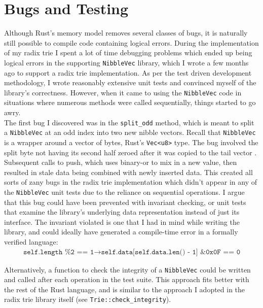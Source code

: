 \documentclass[a4paper,12pt]{article}
\newcommand{\code}[1]{\texttt{#1}}
\begin{document}
\section{Bugs and Testing}

Although Rust's memory model removes several classes of bugs, it is naturally still possible to compile code containing logical errors. During the implementation of my radix trie I spent a lot of time debugging problems which ended up being logical errors in the supporting \code{NibbleVec} library, which I wrote a few months ago to support a radix trie implementation. As per the test driven development methodology, I wrote reasonably extensive unit tests and convinced myself of the library's correctness. However, when it came to using the \code{NibbleVec} code in situations where numerous methods were called sequentially, things started to go awry.\\

The first bug I discovered was in the \code{split\_odd} method, which is meant to split a \code{NibbleVec} at an odd index into two new nibble vectors. Recall that \code{NibbleVec} is a wrapper around a vector of bytes, Rust's \code{Vec<u8>} type. The bug involved the split byte not having its second half zeroed after it was copied to the tail vector \cite{nibble-vec-split-odd-fix}. Subsequent calls to push, which uses binary-or to mix in a new value, then resulted in stale data being combined with newly inserted data. This created all sorts of zany bugs in the radix trie implementation which didn't appear in any of the \code{NibbleVec} unit tests due to the reliance on sequential operations. I argue that this bug could have been prevented with invariant checking, or unit tests that examine the library's underlying data representation instead of just its interface. The invariant violated is one that I had in mind while writing the library, and could ideally have generated a compile-time error in a formally verified language:
\begin{eqnarray*}
\code{self.length \% 2 == 1} \rightarrow \code{self.data[self.data.len() - 1] \& 0x0F == 0}
\end{eqnarray*}

Alternatively, a function to check the integrity of a \code{NibbleVec} could be written and called after each operation in the test suite. This approach fits better with the rest of the Rust language, and is similar to the approach I adopted in the radix trie library itself (see \code{Trie::check\_integrity}).\\
\end{document}
